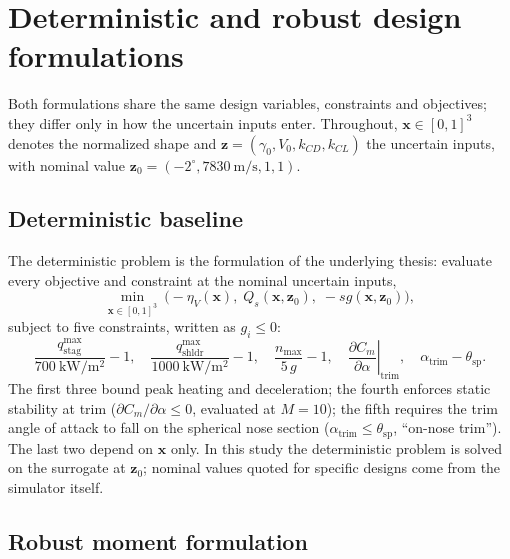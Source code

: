 \section{Deterministic and robust design formulations}
\label{sec:formulation}

Both formulations share the same design variables, constraints and
objectives; they differ only in how the uncertain inputs enter. Throughout,
$\mathbf{x}\in[0,1]^3$ denotes the normalized shape and
$\mathbf{z}=(\gamma_0,V_0,k_{CD},k_{CL})$ the uncertain inputs, with nominal
value $\mathbf{z}_0=(-2^\circ,7830\ \si{\metre\per\second},1,1)$.

\subsection{Deterministic baseline}
\label{sec:detform}

The deterministic problem is the formulation of the underlying thesis:
evaluate every objective and constraint at the nominal uncertain inputs,
\begin{equation}
\min_{\mathbf{x}\in[0,1]^3}\ \bigl(-\eta_V(\mathbf{x}),\;
  Q_s(\mathbf{x},\mathbf{z}_0),\; -sg(\mathbf{x},\mathbf{z}_0)\bigr),
\label{eq:det}
\end{equation}
subject to five constraints, written as $g_i\le 0$:
\begin{equation}
\frac{q_{\mathrm{stag}}^{\max}}{700\ \si{\kilo\watt\per\square\metre}}-1,\quad
\frac{q_{\mathrm{shldr}}^{\max}}{1000\ \si{\kilo\watt\per\square\metre}}-1,\quad
\frac{n_{\max}}{5\,g}-1,\quad
\left.\frac{\partial C_m}{\partial\alpha}\right|_{\mathrm{trim}},\quad
\alpha_{\mathrm{trim}}-\theta_{\mathrm{sp}} .
\label{eq:detcon}
\end{equation}
The first three bound peak heating and deceleration; the fourth enforces
static stability at trim ($\partial C_m/\partial\alpha\le0$, evaluated at
$M=10$); the fifth requires the trim angle of attack to fall on the
spherical nose section ($\alpha_{\mathrm{trim}}\le\theta_{\mathrm{sp}}$,
``on-nose trim''). The last two depend on $\mathbf{x}$ only. In this study
the deterministic problem is solved on the surrogate at $\mathbf{z}_0$;
nominal values quoted for specific designs come from the simulator itself.

\subsection{Robust moment formulation}
\label{sec:robform}

